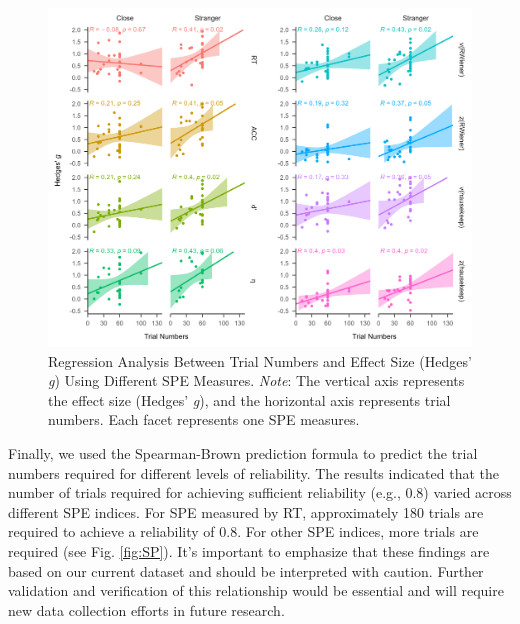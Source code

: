 \documentclass[sn-apa]{sn-jnl}%
\theoremstyle{thmstyleone}%
\theoremstyle{thmstyletwo}%
\theoremstyle{thmstylethree}%
\begin{document}
\begin{figure}[!ht]
	\centering
	\includegraphics[width=1\textwidth]{./Figure/Fig9_cor_yi&trials.png} 
	\caption[Regression Analysis Between Trial Numbers and Effect Size (Hedges’ \textit{g}) Using Different SPE Measures.]{Regression Analysis Between Trial Numbers and Effect Size (Hedges’ \textit{g}) Using Different SPE Measures.  \textit{Note}: The vertical axis represents the effect size (Hedges’ \textit{g}), and the horizontal axis represents trial numbers. Each facet represents one SPE measures.
	}\label{fig:g_nTrial}
\end{figure}

Finally, we used the Spearman-Brown prediction formula to predict the trial numbers required for different levels of reliability. The results indicated that the number of trials required for achieving sufficient reliability (e.g., 0.8) varied across different SPE indices. For SPE measured by RT, approximately 180 trials are required to achieve a reliability of 0.8. For other SPE indices, more trials are required (see Fig. \ref{fig:SP}). It's important to emphasize that these findings are based on our current dataset and should be interpreted with caution. Further validation and verification of this relationship would be essential and will require new data collection efforts in future research.
\end{document}
